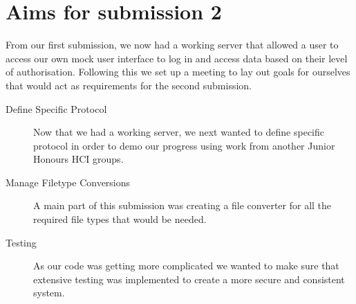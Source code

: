 \section{Aims for submission 2}
From our first submission, we now had a working server that allowed a user to access our own mock user interface to log in and access data based on their level of authorisation. Following this we set up a meeting to lay out goals for ourselves that would act as requirements for the second submission.
\begin{description}
  \item[Define Specific Protocol] Now that we had a working server, we next wanted to define specific protocol in order to demo our progress using work from another Junior Honours HCI groups.
  \item[Manage Filetype Conversions] A main part of this submission was creating a file converter for all the required file types that would be needed.
  \item[Testing] As our code was getting more complicated we wanted to make sure that extensive testing was implemented to create a more secure and consistent system.
\end{description}
